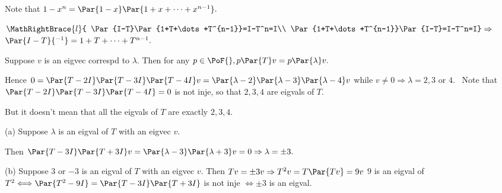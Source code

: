 Note that $1-x^n=\Par{1-x}\Par{1+x+\dots+x^{n-1}}.$\par
\Blind{\Solution} \!\!\!$\MathRightBrace{l}{
\Par{I-T}\Par{1+T+\dots+T^{n-1}}=I-T^n=I\\
\Par{1+T+\dots+T^{n-1}}\Par{I-T}=I-T^n=I}\Rightarrow$ $\Par{I-T}{^{-1}}=1+T+\dots+T^{n-1}.$\PfEnd
\SepLine

\par\quad
Suppose $v$ is an eigvec correspd to $\lambda.$ Then for any $p\in\PoF{},p\Par{T}v=p\Par{\lambda}v.$\par\quad
Hence $0=\Par{T - 2I}\Par{T - 3I}\Par{T - 4I}v=\Par{\lambda-2}\Par{\lambda-3}\Par{\lambda-4}v$ while $v\neq 0\Rightarrow\lambda = 2,3$ or $4.$\PfEnd\vspace{2pt}
\Comment \,\,\,Note that $\Par{T-2I}\Par{T-3I}\Par{T-4I}=0$ is not inje, so that $2,3,4$ are eigvals of $T.$\par
\Blind{\Comment \,\,\,}But it doesn't mean that all the eigvals of $T$ are exactly $2,3,4.$
\SepLine

\par\quad
(a) Suppose $\lambda$ is an eigval of $T$ with an eigvec $v.$\par\quad\Ha
Then $\Par{T-3I}\Par{T+3I}v=\Par{\lambda-3}\Par{\lambda+3}v=0\Rightarrow\lambda=\pm 3.$\par\quad
(b) Suppose $3$ or $-3$ is an eigval of $T$ with an eigvec $v.$ Then $Tv=\pm 3v\Rightarrow T^2 v=T\Par{Tv}=9v$\PfEnd\vspace{4pt}\quad
\Or $9$ is an eigval of $T^2\Longleftrightarrow\Par{T^2-9I}=\Par{T-3I}\Par{T+3I}$ is not inje $\Longleftrightarrow\pm 3$ is an eigval.\PfEnd
\par
\SepLine

